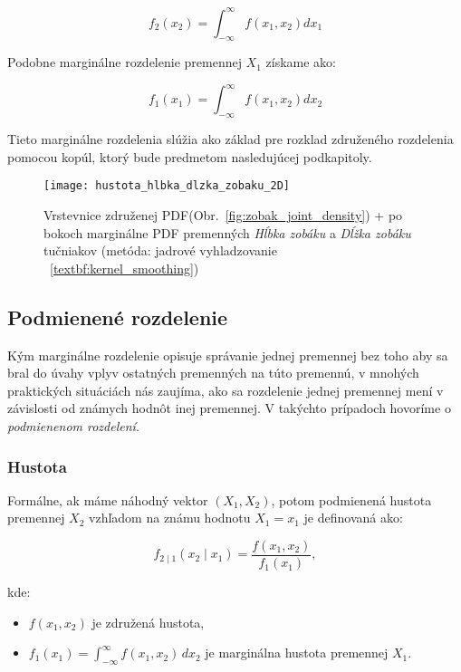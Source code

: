 \begin{equation} f_2(x_2) = \int_{-\infty}^{\infty} f(x_1, x_2) dx_1 \end{equation}

Podobne marginálne rozdelenie premennej $X_1$ získame ako:

\begin{equation} f_1(x_1) = \int_{-\infty}^{\infty} f(x_1, x_2)  dx_2 \end{equation}

Tieto marginálne rozdelenia slúžia ako základ pre rozklad združeného rozdelenia pomocou kopúl, ktorý bude predmetom nasledujúcej podkapitoly.

\begin{figure}[H]
    \centering
    \texttt{[image: hustota\_hlbka\_dlzka\_zobaku\_2D]}
    \caption{Vrstevnice združenej PDF(Obr.~\ref{fig:zobak_joint_density}) + po bokoch marginálne PDF premenných \textit{Hĺbka zobáku} a \textit{Dĺžka zobáku} tučniakov (metóda: jadrové vyhladzovanie ~\ref{textbf:kernel_smoothing})}
    \label{fig:zobak_marg_density}
\end{figure}

\subsection{Podmienené rozdelenie}\label{subsec:conditional_distribution}

Kým marginálne rozdelenie opisuje správanie jednej premennej bez toho aby sa bral do úvahy vplyv ostatných premenných na túto premennú, v mnohých praktických situáciách nás zaujíma, ako sa rozdelenie jednej premennej mení v závislosti od známych hodnôt inej premennej. V takýchto prípadoch hovoríme o \textit{podmienenom rozdelení}.

\subsubsection{Hustota}\label{subsubsec:conditional_density}

Formálne, ak máme náhodný vektor $(X_1, X_2)$, potom podmienená hustota premennej $X_2$ vzhľadom na známu hodnotu $X_1 = x_1$ je definovaná ako:

\begin{equation}
f_{2 \mid 1}(x_2 \mid x_1) = \frac{f(x_1, x_2)}{f_1(x_1)},
\end{equation}

kde:
\begin{itemize}
  \item $f(x_1, x_2)$ je združená hustota,
  \item $f_1(x_1) = \int_{-\infty}^{\infty} f(x_1, x_2) \, dx_2$ je marginálna hustota premennej $X_1$.
\end{itemize}

